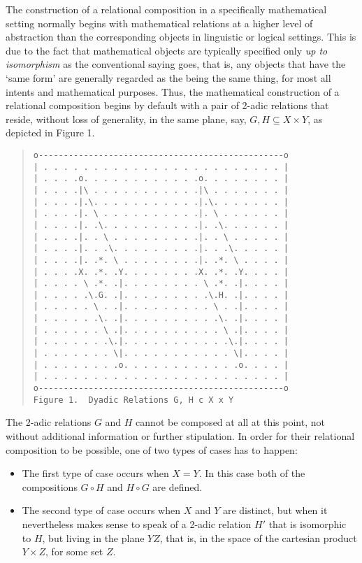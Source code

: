 \documentclass[12pt]{article}
\begin{document}
The construction of a relational composition in a specifically mathematical setting normally begins with mathematical relations at a higher level of abstraction than the corresponding objects in linguistic or logical settings.  This is due to the fact that mathematical objects are typically specified only \textit{up to isomorphism} as the conventional saying goes, that is, any objects that have the `same form' are generally regarded as the being the same thing, for most all intents and mathematical purposes.  Thus, the mathematical construction of a relational composition begins by default with a pair of 2-adic relations that reside, without loss of generality, in the same plane, say, $G, H \subseteq X \times Y$, as depicted in Figure 1.

\begin{quote}\begin{verbatim}
o-------------------------------------------------o
| . . . . . . . . . . . . . . . . . . . . . . . . |
| . . . .o. . . . . . . . . . . .o. . . . . . . . |
| . . . .|\ . . . . . . . . . . .|\ . . . . . . . |
| . . . .|.\. . . . . . . . . . .|.\. . . . . . . |
| . . . .|. \ . . . . . . . . . .|. \ . . . . . . |
| . . . .|. .\. . . . . . . . . .|. .\. . . . . . |
| . . . .|. . \ . . . . . . . . .|. . \ . . . . . |
| . . . .|. . .\. . . . . . . . .|. . .\. . . . . |
| . . . .|. .*. \ . . . . . . . .|. .*. \ . . . . |
| . . . .X. .*. .Y. . . . . . . .X. .*. .Y. . . . |
| . . . . \ .*. .|. . . . . . . . \ .*. .|. . . . |
| . . . . .\.G. .|. . . . . . . . .\.H. .|. . . . |
| . . . . . \ . .|. . . . . . . . . \ . .|. . . . |
| . . . . . .\. .|. . . . . . . . . .\. .|. . . . |
| . . . . . . \ .|. . . . . . . . . . \ .|. . . . |
| . . . . . . .\.|. . . . . . . . . . .\.|. . . . |
| . . . . . . . \|. . . . . . . . . . . \|. . . . |
| . . . . . . . .o. . . . . . . . . . . .o. . . . |
| . . . . . . . . . . . . . . . . . . . . . . . . |
o-------------------------------------------------o
Figure 1.  Dyadic Relations G, H c X x Y
\end{verbatim}\end{quote}

The 2-adic relations $G$ and $H$ cannot be composed at all at this point, not without additional information or further stipulation.  In order for their relational composition to be possible, one of two types of cases has to happen:

\begin{itemize}
\item
The first type of case occurs when $X = Y$.  In this case both of the compositions $G \circ H$ and $H \circ G$ are defined.
\item
The second type of case occurs when $X$ and $Y$ are distinct, but when it nevertheless makes sense to speak of a 2-adic relation $H'$ that is isomorphic to $H$, but living in the plane $YZ$, that is, in the space of the cartesian product $Y \times Z$, for some set $Z$.
\end{itemize}
\end{document}
